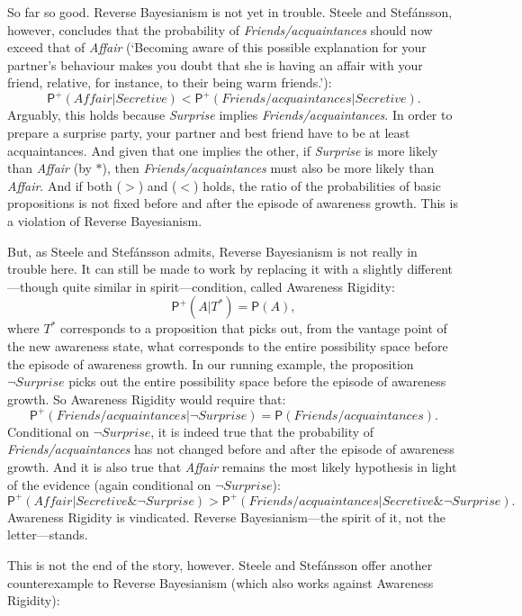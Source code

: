 \documentclass[
  11pt,
  dvipsnames,enabledeprecatedfontcommands]{scrartcl}
\newcommand{\pr}[1]{\ensuremath{\mathsf{P}(#1)}}
\newcommand{\ppr}[2]{\ensuremath{\mathsf{P}^{#1}(#2)}}
\begin{document}
So far so good. Reverse Bayesianism is not yet in trouble. Steele and
Stefánsson, however, concludes that the probability of
\textit{Friends/acquaintances} should now exceed that of \textit{Affair}
(`Becoming aware of this possible explanation for your partner's
behaviour makes you doubt that she is having an affair with your friend,
relative, for instance, to their being warm friends.'):
\[\ppr{+}{\textit{Affair} \vert  \textit{Secretive} } < \ppr{+}{\textit{Friends/acquaintances} \vert \textit{Secretive}}. \tag{<}\]
Arguably, this holds because \textit{Surprise} implies
\textit{Friends/acquaintances}. In order to prepare a surprise party,
your partner and best friend have to be at least acquaintances. And
given that one implies the other, if \textit{Surprise} is more likely
than \textit{Affair} (by \(*\)), then \textit{Friends/acquaintances}
must also be more likely than \textit{Affair}. And if both (\(>\)) and
(\(<\)) holds, the ratio of the probabilities of basic propositions is
not fixed before and after the episode of awareness growth. This is a
violation of Reverse Bayesianism.

But, as Steele and Stefánsson admits, Reverse Bayesianism is not really
in trouble here. It can still be made to work by replacing it with a
slightly different---though quite similar in spirit---condition, called
Awareness Rigidity: \[\ppr{+}{A \vert T^*}=\pr{A},\] where \(T^*\)
corresponds to a proposition that picks out, from the vantage point of
the new awareness state, what corresponds to the entire possibility
space before the episode of awareness growth. In our running example,
the proposition \(\neg\textit{Surprise}\) picks out the entire
possibility space before the episode of awareness growth. So Awareness
Rigidity would require that:
\[\ppr{+}{\textit{Friends/acquaintances} \vert \neg\textit{Surprise}}=\pr{\textit{Friends/acquaintances}}.\]
Conditional on \(\neg\textit{Surprise}\), it is indeed true that the
probability of \textit{Friends/acquaintances} has not changed before and
after the episode of awareness growth. And it is also true that
\textit{Affair} remains the most likely hypothesis in light of the
evidence (again conditional on \(\neg\textit{Surprise}\)):
\[\ppr{+}{\textit{Affair} \vert  \textit{Secretive} \& \neg\textit{Surprise} } > \ppr{+}{\textit{Friends/acquaintances} \vert \textit{Secretive} \& \neg\textit{Surprise}}. \tag{$>^+$}\]
Awareness Rigidity is vindicated. Reverse Bayesianism---the spirit of
it, not the letter---stands.

This is not the end of the story, however. Steele and Stefánsson offer
another counterexample to Reverse Bayesianism (which also works against
Awareness Rigidity):
\end{document}
